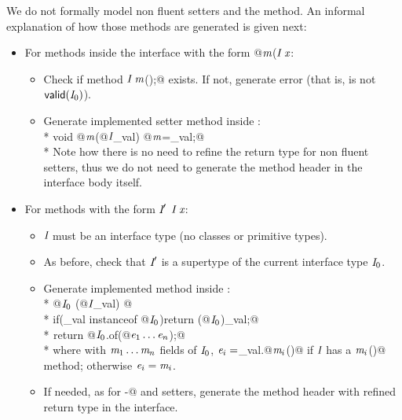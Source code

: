 We do not formally model non fluent setters and the \Q@with@ method. 
An informal explanation of how those methods are generated is given next:
\begin{itemize}
\item For methods inside the interface with the form \Q@void @$\textit{m}$\QM($\C\ \x$\QM{);}:
  \begin{itemize}
    \item Check if method $\textit{I}\ \textit{m}$\Q@();@ exists. If not, generate error (that is, is not $\textsf{valid}(\textit{I}_0)$).
    \item Generate implemented setter method inside \Q@of@:\\*
           \Q@public void @$\textit{m}$\Q@(@$\textit{I}$\Q@ _val) { @$\textit{m}$\Q@=_val;}@\\*
    Note how there is no need to refine the return type for non fluent setters, thus we do not need to generate the method header in the interface body itself.
    \end{itemize}
\item For methods with the form $\C'\ $$\C\ \x$\QM{);}:
  \begin{itemize}
   \item $\textit{I}$ must be an interface type (no classes or primitive types).
    \item As before, check that $\textit{I}'$ is a supertype of the current interface type $\textit{I}_0$.
    \item Generate implemented \Q@with@ method inside \Q@of@:\\*
           \Q@public @$\textit{I}_0\ $\Q@with(@$\textit{I}$\Q@ _val) { @\\*
           \Q@  if(_val instanceof @$\textit{I}_0$\Q@){return (@$\textit{I}_0$\Q@)_val;}@\\*
${}_{}$\Q@  return @$\textit{I}_0$\Q@.of(@$\textit{e}_1\ldots\textit{e}_n$\Q@);}@\\*
where with $\textit{m}_1\ldots\textit{m}_n$  fields of $\textit{I}_0$,
$\textit{e}_i=$\Q@_val.@$\textit{m}_i$\Q@()@ if $\textit{I}$ has a $\textit{m}_i$\Q@()@ method; otherwise
$\textit{e}_i=\textit{m}_i$.
    \item If needed, as for \Q@with-@ and setters, generate the method header with refined return type in the interface.
 \end{itemize}

\end{itemize}


